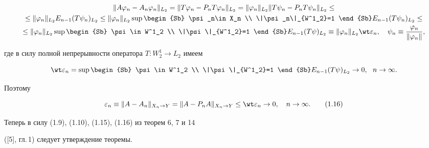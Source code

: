 \begin{multline*}


\|A\vp_n-A_n\vp_n\|_{L_2}=\|T\vp_n-P_nT\vp_n\|_{L_2}=\|\vp_n\|_{L_2}


\|T\psi_n-P_nT\psi_n\|_{L_2} \le \\


%


\le \|\vp_n\|_{L_2} E_{n-1}(T\psi_n)_{L_2}\le\|\vp_n\|_{L_2}


\sup \begin{Sb} \psi_n\in X_n \\ \|\psi_n\|_{W^1_2}=1 \end{Sb}


E_{n-1}(T\psi_n)_{L_2}\le \\


%


\le\|\vp_n\|_{L_2}\sup \begin{Sb} \psi\in W^1_2 \\ \|\psi\|_{W^1_2}=1


\end{Sb}


E_{n-1}(T\psi)_{L_2}\equiv\|\vp_n\|_{L_2}\wt\varepsilon_n,\quad\psi_n


\equiv\frac{\vp_n}{\|\vp_n\|},


\end{multline*}


где в силу полной непрерывности оператора $T:W^1_2\to L_2$ имеем


$$


\wt\varepsilon_n=


\sup \begin{Sb} \psi\in W^1_2 \\ \|\psi\|_{W^1_2}=1 \end{Sb}E_{n-1}(T


\psi)_{L_2}\to 0,\ \ n\to\infty.


$$


Поэтому


\begin{equation}


\ve_n \equiv \|A-A_n\|_{X_n\to Y}=\|A-P_nA\|_{X_n\to Y}\le\wt


\varepsilon_n\to 0,\quad n\to \infty.


\tag{1.16}


\end{equation}


Теперь в силу (1.9), (1.10), (1.15), (1.16) из теорем 6, 7 и 14 


([5], гл.\,1) следует утверждение теоремы.


